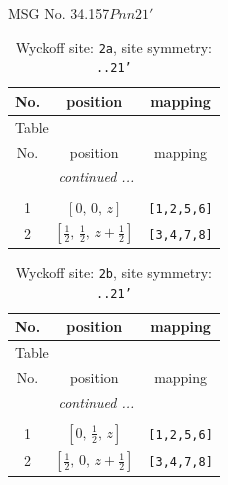 \documentclass[fleqn,8pt]{jsarticle}
\begin{document}
\setcounter{MaxMatrixCols}{32}

\renewcommand{\tablename}{Table~}
\renewcommand{\figurename}{Figure~}
\begin{center}
\LARGE
MSG No. 34.157\quad$Pnn21'$
\end{center}
\renewcommand{\arraystretch}{1.2}
\begin{longtable}{ccc}
\caption{Wyckoff site: {\tt 2a}, site symmetry: {\tt ..21'}}
 \\
 \hline \hline
No. & position & mapping \\ \hline \endfirsthead

\multicolumn{2}{l}{\tablename\ \thetable{}} \\
 \hline \hline
No. & position & mapping \\ \hline \endhead

 \hline \hline
\multicolumn{2}{r}{\footnotesize\it continued ...} \\ \endfoot

 \hline \hline
\multicolumn{2}{r}{} \\ \endlastfoot

1 & $\left[ 0,\, 0,\, z \right]$ & {\tt [1,2,5,6]} \\ \hline
2 & $\left[ \frac{1}{2},\, \frac{1}{2},\, z + \frac{1}{2} \right]$ & {\tt [3,4,7,8]} \\
\end{longtable}
\renewcommand{\arraystretch}{1.2}
\begin{longtable}{ccc}
\caption{Wyckoff site: {\tt 2b}, site symmetry: {\tt ..21'}}
 \\
 \hline \hline
No. & position & mapping \\ \hline \endfirsthead

\multicolumn{2}{l}{\tablename\ \thetable{}} \\
 \hline \hline
No. & position & mapping \\ \hline \endhead

 \hline \hline
\multicolumn{2}{r}{\footnotesize\it continued ...} \\ \endfoot

 \hline \hline
\multicolumn{2}{r}{} \\ \endlastfoot

1 & $\left[ 0,\, \frac{1}{2},\, z \right]$ & {\tt [1,2,5,6]} \\ \hline
2 & $\left[ \frac{1}{2},\, 0,\, z + \frac{1}{2} \right]$ & {\tt [3,4,7,8]} \\
\end{longtable}
\end{document}
